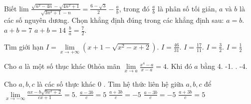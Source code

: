 \begin{ex}%
	Biết lim $\frac{\sqrt{n^2-4 n}-\sqrt{4 n^2+1}}{\sqrt{3 n^2+1}-n}=\frac{6-\sqrt{3}}{2}-\frac{a}{b}$, trong đó $\frac{a}{b}$ là phân số tối giản, $a$ và $b$ là các số nguyên dương. Chọn khẳng định đúng trong các khẳng định sau:
\choice
{ $a=b$.}
{ $a+b=7$}
{\True $a+b=14$}
{$\frac{b}{a}=\frac{7}{2}$.}
\end{ex}
\begin{ex}%
	Tìm giới hạn $I=\lim \limits_{x \rightarrow+\infty}\left(x+1-\sqrt{x^2-x+2}\right)$.
\choice
{$I=\frac{46}{31}$.}
{$I=\frac{17}{11}$.}
{\True $I=\frac{3}{2}$.}
{$I=\frac{1}{2}$}
\end{ex}
\begin{ex}%
	Cho $a$ là một số thục khác 0thỏa mãn $\lim \limits_{x \rightarrow a} \frac{x^4-a}{x-a}=4$.
	Khi đó $a$ bằng
\choice
{4.}
{-1.}
{.}
{-4.}
\end{ex}
\begin{ex}%
	Cho $a, b, c$ là các số thực khác 0 . Tìm hệ thức liên hệ giữa $a, b, c$ để $\lim \limits_{x \rightarrow-\infty} \frac{a x-b \sqrt{9 x^2+2}}{c x+1}=5$.
\choice
{$\frac{a-3 b}{c}=5$}
{$\frac{a+3 b}{c}=-5$}
{$\frac{a-3 b}{c}=-5$}
{\True $\frac{a+3 b}{c}=5$}
\end{ex}
